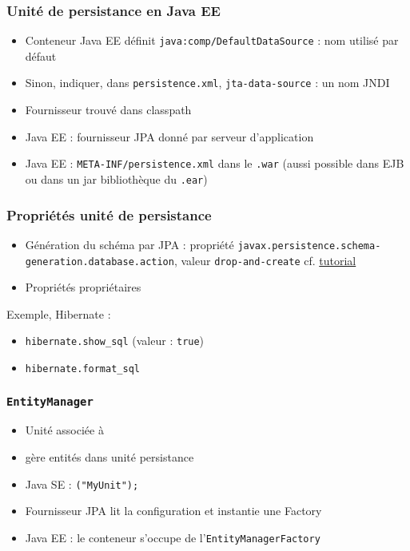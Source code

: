 \documentclass[french, english]{beamer}
\begin{document}
\begin{frame}
	\frametitle{Unité de persistance en Java EE}
	\begin{itemize}
		\item Conteneur Java EE définit \texttt{java:comp/DefaultDataSource} : nom utilisé par défaut
		\item Sinon, indiquer, dans \texttt{persistence.xml}, \texttt{jta-data-source} : un nom JNDI
		\item Fournisseur trouvé dans classpath
		\item Java EE : fournisseur JPA donné par serveur d’application
		\item Java EE : \texttt{META-INF/persistence.xml} dans le \texttt{.war} {\tiny (aussi possible dans EJB ou dans un jar bibliothèque du \texttt{.ear})}
	\end{itemize}
\end{frame}

\begin{frame}
	\frametitle{Propriétés unité de persistance}
	\begin{itemize}
		\item Génération du schéma par JPA : propriété {\small\texttt{javax.persistence.schema-generation.database.action}}, valeur {\small\texttt{drop-and-create}} {\tiny cf. \href{https://docs.oracle.com/javaee/7/tutorial/persistence-intro005.htm}{tutorial}}
		\item Propriétés propriétaires
	\end{itemize}
Exemple, Hibernate :
	\begin{itemize}
		\item \texttt{hibernate.show\_sql} (valeur : \texttt{true})
		\item \texttt{hibernate.format\_sql}
	\end{itemize}
\end{frame}

\begin{frame}
	\frametitle{\texttt{EntityManager}}
	\begin{itemize}
		\item Unité associée à 
		\item {} gère entités dans unité persistance
		\item Java SE : {\small \texttt{("MyUnit");}}
		\item Fournisseur JPA lit la configuration et instantie une Factory
		\item Java EE : le conteneur s’occupe de l’\texttt{EntityManagerFactory}
	\end{itemize}
\end{frame}
\end{document}
